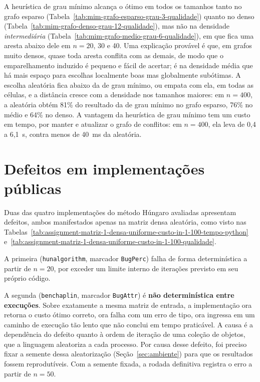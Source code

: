 A heurística de grau mínimo alcança o ótimo em todos os tamanhos
tanto no grafo esparso
(Tabela~\ref{tab:mim-grafo-esparso-grau-3-qualidade}) quanto no denso
(Tabela~\ref{tab:mim-grafo-denso-grau-12-qualidade}), mas não na densidade
\textit{intermediária} (Tabela~\ref{tab:mim-grafo-medio-grau-6-qualidade}), em que
fica uma aresta abaixo dele em $n = 20$, 30 e 40. Uma explicação provável é que, em grafos
muito densos, quase toda aresta conflita com as demais, de modo que o
emparelhamento induzido é pequeno e fácil de acertar; é na densidade média que há
mais espaço para escolhas localmente boas mas globalmente subótimas. A escolha
aleatória fica abaixo da de grau mínimo, ou empata com ela, em todas as células, e
a distância cresce com a densidade nos tamanhos maiores: em $n = 400$, a aleatória
obtém 81\% do resultado da de grau mínimo no grafo esparso, 76\% no médio e 64\% no
denso. A vantagem da heurística de grau mínimo tem um custo em tempo, por manter e
atualizar o grafo de conflitos: em $n = 400$, ela leva de 0{,}4 a 6{,}1~s, contra
menos de 40~ms da aleatória.

\section{Defeitos em implementações públicas}
\label{sec:defeitos}

Duas das
quatro implementações do método Húngaro avaliadas apresentam defeitos, ambos
manifestados apenas na matriz densa aleatória, como visto nas
Tabelas~\ref{tab:assignment-matriz-1-densa-uniforme-custo-in-1-100-tempo-python}
e~\ref{tab:assignment-matriz-1-densa-uniforme-custo-in-1-100-qualidade}.

A primeira (\texttt{hunalgorithm}, marcador \texttt{BugPerc}) falha de forma
determinística a partir de $n = 20$, por exceder um limite interno de iterações
previsto em seu próprio código.

A segunda (\texttt{benchaplin}, marcador \texttt{BugAttr}) é
\textbf{não determinística entre execuções}. Sobre exatamente a mesma matriz de
entrada, a implementação ora retorna o custo ótimo correto, ora falha com um erro
de tipo, ora ingressa em um caminho de execução tão lento que não conclui em tempo
praticável. A causa é a dependência do defeito quanto à ordem de iteração de uma
coleção de objetos, que a linguagem aleatoriza a cada processo. Por causa desse
defeito, foi preciso fixar a semente dessa aleatorização
(Seção~\ref{sec:ambiente}) para que os resultados fossem reprodutíveis. Com a semente fixada, a rodada definitiva registra o erro a partir
de $n = 50$.

